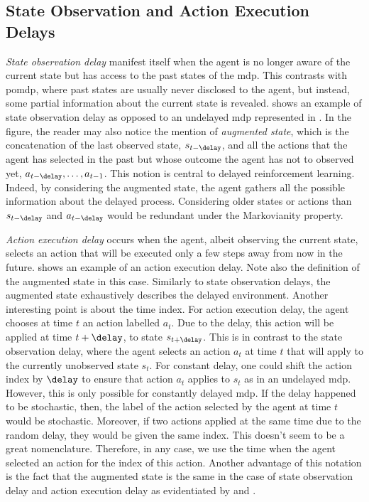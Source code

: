 \subsection{State Observation and Action Execution Delays}
\label{subsec:state_action_delays}
\emph{State observation delay} manifest itself when the agent is no longer aware of the current state but has access to the past states of the \gls{mdp}. 
This contrasts with \gls{pomdp}, where past states are usually never disclosed to the agent, but instead, some partial information about the current state is revealed.  shows an example of state observation delay as opposed to an undelayed \gls{mdp} represented in . 
In the figure, the reader may also notice the mention of \emph{augmented state}, which is the concatenation of the last observed state, $s_{t-\delay}$, and all the actions that the agent has selected in the past but whose outcome the agent has not to observed yet, $a_{t-\delay},\dots,a_{t-1}$. 
This notion is central to delayed reinforcement learning. 
Indeed, by considering the augmented state, the agent gathers all the possible information about the delayed process. 
Considering older states or actions than $s_{t-\delay}$ and $a_{t-\delay}$ would be redundant under the Markovianity property.

\emph{Action execution delay} occurs when the agent, albeit observing the current state, selects an action that will be executed only a few steps away from now in the future.
 shows an example of an action execution delay.
Note also the definition of the augmented state in this case.
Similarly to state observation delays, the augmented state exhaustively describes the delayed environment.
Another interesting point is about the time index. 
For action execution delay, the agent chooses at time $t$ an action labelled $a_t$. 
Due to the delay, this action will be applied at time $t+\delay$, to state $s_{t+\delay}$.
This is in contrast to the state observation delay, where the agent selects an action $a_t$ at time $t$ that will apply to the currently unobserved state $s_t$.
For constant delay, one could shift the action index by $\delay$ to ensure that action $a_t$ applies to $s_t$ as in an undelayed \gls{mdp}. 
However, this is only possible for constantly delayed \gls{mdp}. 
If the delay happened to be stochastic, then, the label of the action selected by the agent at time $t$ would be stochastic.
Moreover, if two actions applied at the same time due to the random delay, they would be given the same index. 
This doesn't seem to be a great nomenclature.
Therefore, in any case, we use the time when the agent selected an action for the index of this action.
Another advantage of this notation is the fact that the augmented state is the same in the case of state observation delay and action execution delay as evidentiated by  and .

